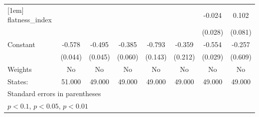 {\begin{tabular}{l*{7}{c}}
[1em]
flatness\_index&                     &                     &                     &                     &                     &      -0.024         &       0.102         \\
            &                     &                     &                     &                     &                     &     (0.028)         &     (0.081)         \\
[1em]
Constant    &      -0.578\sym{***}&      -0.495\sym{***}&      -0.385\sym{***}&      -0.793\sym{***}&      -0.359\sym{*}  &      -0.554\sym{***}&      -0.257         \\
            &     (0.044)         &     (0.045)         &     (0.060)         &     (0.143)         &     (0.212)         &     (0.029)         &     (0.609)         \\
\hline
Weights     &          No         &          No         &          No         &          No         &          No         &          No         &          No         \\
States:     &      51.000         &      49.000         &      49.000         &      49.000         &      49.000         &      49.000         &      49.000         \\
\hline\hline
\multicolumn{8}{l}{\footnotesize Standard errors in parentheses}\\
\multicolumn{8}{l}{\footnotesize \sym{*} \(p<0.1\), \sym{**} \(p<0.05\), \sym{***} \(p<0.01\)}\\
\end{tabular}
}
